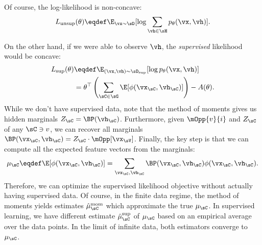 
Of course, the log-likelihood is non-concave:
\begin{align}
L_\text{unsup}(\theta) \eqdef \E_{\vx \sim \sD}[\log \sum_{\vh \in \sH} p_\theta(\vx,\vh)].
\end{align}

On the other hand, 
if we were able to observe $\vh$, the \emph{supervised} likelihood would be concave:
\begin{align}
\label{eqn:logLinearSupervised}
L_\text{sup}(\theta) &\eqdef \E_{(\vx,\vh) \sim \sD_\text{sup}}[\log p_\theta(\vx,\vh)] \\
                     &= \theta^\top \left(\sum_{\sC \in \sG} \E[\phi(\vx_\sC,\vh_\sC)]\right) - A(\theta).
\end{align}
While we don't have supervised data,
note that the method of moments gives us hidden marginals $Z_\sC = \BP(\vh_\sC)$.
Furthermore, given $\mOpp{v}{i}$ and $Z_\sC$ of any $\sC \ni v$, we can recover
all marginals $\BP(\vx_\sC, \vh_\sC) = Z_\sC \cdot \mOpp[\vx_\sV]$.
Finally, the key step is that we can compute all the expected feature vectors from the marginals:
\begin{align}
\label{eqn:logLinearFeatures}
\mu_\sC \eqdef \E[\phi(\vx_\sC,\vh_\sC)] = \sum_{\vx_\sC,\vh_\sC} \BP(\vx_\sC,\vh_\sC) \phi(\vx_\sC,\vh_\sC).
\end{align}
Therefore, we can optimize the supervised likelihood objective without actually
having supervised data.
Of course, in the finite data regime, the method of moments yields estimates
$\hat \mu^\text{mom}_\sC$ which approximate the true $\mu_\sC$.
In supervised learning, we have different estimate $\hat\mu^\text{sup}_\sC$ of $\mu_\sC$ based on an empirical average
over the data points.
In the limit of infinite data, both estimators converge to $\mu_\sC$.

